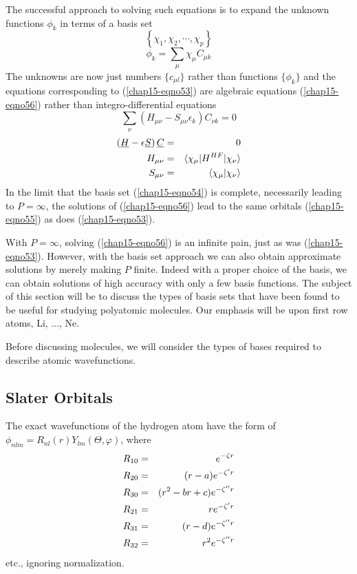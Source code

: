 The successful approach to solving such equations is to expand the
unknown functions $\phi_k$ in terms of a basis set
\begin{equation}
\left\{ \chi_1 , \chi_2 , \cdots , \chi_p \right\}
\label{chap15-eqno54}
\end{equation}
\begin{equation}
\phi_k = \sum_{\mu} \chi_{\mu} C_{\mu k}
\label{chap15-eqno55}
\end{equation}
The unknowns are now just numbers $\{ c_{\mu l} \}$ rather than
functions $\{ \phi_k \}$ and the equations corresponding to
(\ref{chap15-eqno53}) are algebraic equations (\ref{chap15-eqno56})
rather than integro-differential equations
\begin{equation}
\sum_{\nu} \left( H_{\mu \nu} - S_{\mu \nu} \epsilon_k \right) C_{\nu 
k} = 0
\label{chap15-eqno56}
\end{equation}
\begin{eqnarray}
\left( \underline{H} - \epsilon \underline{S} \right) \underline{C} &=& 
0\cr
H_{\mu \nu} &=& \langle \chi_{\mu} | H^{HF} | \chi_{\nu} \rangle\cr
S_{\mu \nu} &=& \langle \chi_{\mu} | \chi_{\nu} \rangle
\end{eqnarray}
In the limit that the basis set (\ref{chap15-eqno54}) is complete,
necessarily leading to $P = \infty$, the solutions of
(\ref{chap15-eqno56}) lead to the same orbitals (\ref{chap15-eqno55})
as does (\ref{chap15-eqno53}).

With $P = \infty$, solving (\ref{chap15-eqno56}) is an infinite pain,
just as was (\ref{chap15-eqno53}). However, with the basis set
approach we can also obtain approximate solutions by merely making $P$
finite.  Indeed with a proper choice of the basis, we can obtain
solutions of high accuracy with only a few basis functions. The
subject of this section will be to discuss the types of basis sets
that have been found to be useful for studying polyatomic molecules.
Our emphasis will be upon first row atoms, Li, ..., Ne.

Before discussing molecules, we will consider the types of bases required
to describe atomic wavefunctions.

\subsection{Slater Orbitals}

The exact wavefunctions of the hydrogen atom have the form of 
$\phi_{nlm} = R_{nl}(r) Y_{lm}(\Theta , \varphi)$, where
\begin{eqnarray}
R_{10} &=& e^{-\zeta r}\cr
R_{20} &=& (r - a)e^{-\zeta^{\prime}r}\cr
R_{30} &=& (r^2 - br + c) e^{-\zeta^{\prime \prime}r}\cr
R_{21} &=& re^{-\zeta^{\prime}r}\cr
R_{31} &=& (r-d)e^{-\zeta^{\prime \prime}r}\cr
R_{32} &=& r^2 e^{-\zeta^{\prime\prime}r}
\label{chap15-eqno57}
\end{eqnarray}
etc., ignoring normalization.

